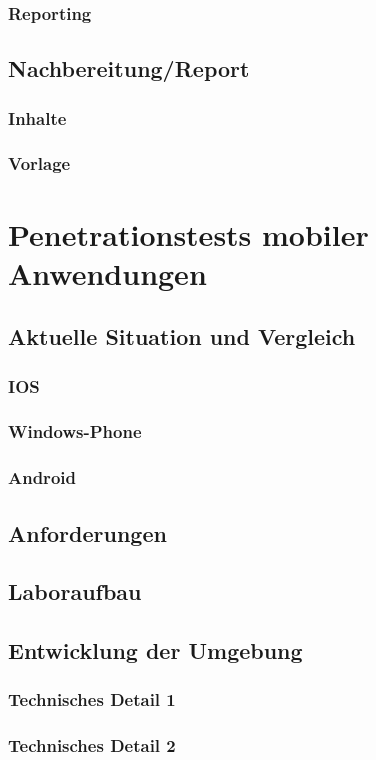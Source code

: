 \documentclass[11pt,DIV=11,twoside, openright, BCOR=3mm]{scrreprt} %
\begin{document}
	            	\subsection{Reporting}    	
	            \section{Nachbereitung/Report}
	            	\subsection{Inhalte}
	            	\subsection{Vorlage}
	     	\chapter{Penetrationstests mobiler Anwendungen}
	     		\section{Aktuelle Situation und Vergleich}
	     			\subsection{IOS}
	     			\subsection{Windows-Phone}
	     			\subsection{Android}
	     		\section{Anforderungen}
	     		\section{Laboraufbau}
	     		\section{Entwicklung der Umgebung}
	     			\subsection{Technisches Detail 1}
	     			\subsection{Technisches Detail 2}
\end{document}
